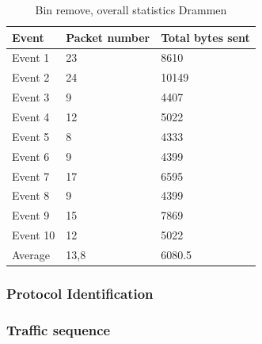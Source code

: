\begin{table}[H]
\centering
\caption{Bin remove, overall statistics Drammen }
\label{tab:BRoverallDRA}
\begin{tabular}{|l|l|l|}
\hline
\textbf{Event} & \textbf{Packet number} & \textbf{Total bytes sent} \\ \hline
Event 1        & 23                     & 8610                      \\ \hline
Event 2        & 24                     & 10149                     \\ \hline
Event 3        & 9                      & 4407                      \\ \hline
Event 4        & 12                     & 5022                      \\ \hline
Event 5        & 8                      & 4333                      \\ \hline
Event 6        & 9                      & 4399                      \\ \hline
Event 7        & 17                     & 6595                      \\ \hline
Event 8        & 9                      & 4399                      \\ \hline
Event 9        & 15                     & 7869                      \\ \hline
Event 10       & 12                     & 5022                      \\ \hline
Average        & 13,8                   & 6080.5                    \\ \hline
\end{tabular}
\end{table}

\subsubsection{Protocol Identification}

\subsubsection{Traffic sequence}

